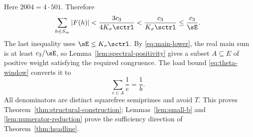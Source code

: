 Here $2004=4\cdot501$.  Therefore
\begin{equation}\label{eq:strict-minor}
 \sum_{h\in S_m}|F(h)|
 <\frac{3c_3}{4K_\sigma\sctrl}
 <\frac{c_3}{K_\sigma\sctrl}
 \le\frac{c_3}{\sE}.
\end{equation}
The last inequality uses $\sE\le K_\sigma\sctrl$.  By
\eqref{eq:main-lower}, the real main sum is at least $c_3/\sE$, so
Lemma~\ref{lem:spectral-positivity} gives a subset $A\subseteq E$ of positive
weight satisfying the required congruence.  The load bound
\eqref{eq:theta-window} converts it to
\[
 \sum_{e\in A}\frac1e=\frac1b.
\]
All denominators are distinct squarefree semiprimes and avoid $T$.  This proves
Theorem~\ref{thm:structural-construction}; Lemmas~\ref{lem:small-b} and
\ref{lem:numerator-reduction} prove the sufficiency direction of
Theorem~\ref{thm:headline}.

